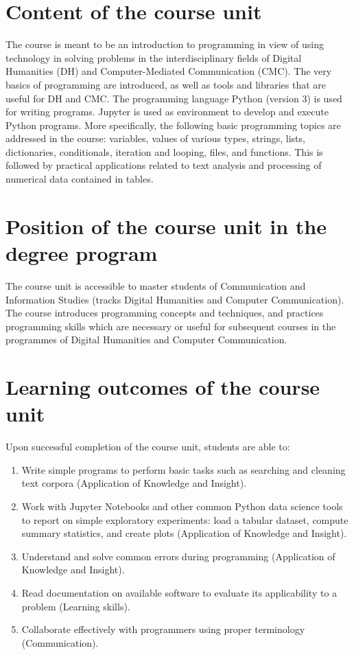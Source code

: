 \documentclass[a4paper,12pt]{article}
\begin{document}
\section{Content of the course unit}

The course is meant to be an introduction to programming in view of using
technology in solving problems in the interdisciplinary fields of Digital
Humanities (DH) and Computer-Mediated Communication (CMC). The very basics of
programming are introduced, as well as tools and libraries
that are useful for DH and CMC. The programming language Python
(version 3) is used for writing programs. Jupyter is used as environment to
develop and execute Python programs. More specifically, the following basic
programming topics are addressed in the course: variables, values of various
types, strings, lists, dictionaries, conditionals, iteration and looping,
files, and functions. This is followed by practical applications related to
text analysis and processing of numerical data contained in tables.

\section{Position of the course unit in the degree program}
The course unit is accessible to master students of Communication and
Information Studies (tracks Digital Humanities and Computer Communication).
The course introduces programming concepts and techniques, and practices
programming skills which are necessary or useful for subsequent courses in the
programmes of Digital Humanities and Computer Communication.

\section{Learning outcomes of the course unit}

Upon successful completion of the course unit, students are able to:

\begin{enumerate}
    \item Write simple programs to perform basic tasks such as searching and
        cleaning text corpora
        (Application of Knowledge and Insight).
    \item Work with Jupyter Notebooks and other common Python data science
        tools to report on simple exploratory experiments: load a tabular
        dataset, compute summary statistics, and create plots
        (Application of Knowledge and Insight).
    \item Understand and solve common errors during programming
        (Application of Knowledge and Insight).
    \item Read documentation on available software to evaluate its
        applicability to a problem
        (Learning skills).
    \item Collaborate effectively with programmers using proper terminology
        (Communication).
\end{enumerate}
\end{document}
